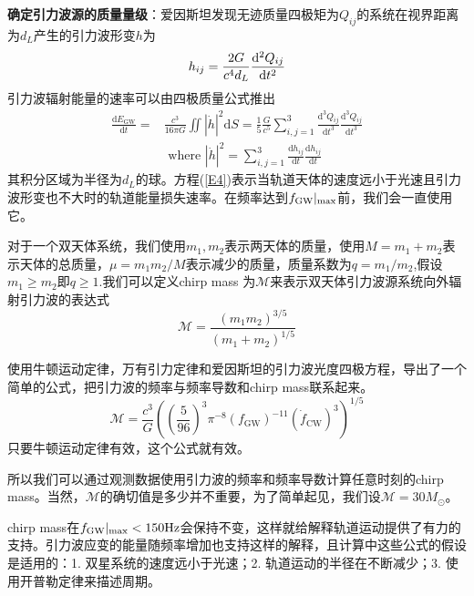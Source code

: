 \documentclass[UTF8]{ctexart}
\begin{document}
\textbf{确定引力波源的质量量级}：爱因斯坦发现无迹质量四极矩为$Q_{ij}$的系统在视界距离为$d_L$产生的引力波形变$h$为
\begin{equation}
h_{ij}=\frac{2G}{c^4d_L}\frac{{\rm d^2}Q_{ij}}{{\rm d}t^2}
\end{equation}
引力波辐射能量的速率可以由四极质量公式推出
\begin{equation}
\label{E4}
\begin{aligned} \frac{\mathrm{d} E_{\mathrm{GW}}}{\mathrm{d} t}=& \frac{c^{3}}{16 \pi G} \iint|\dot{h}|^{2} \mathrm{d} S=\frac{1}{5} \frac{G}{c^{5}} \sum_{i, j=1}^{3} \frac{\mathrm{d}^{3} Q_{i j}}{\mathrm{d} t^{3}} \frac{\mathrm{d}^{3} Q_{i j}}{\mathrm{d} t^{3}} \\ & \text { where }|\dot{h}|^{2}=\sum_{i, j=1}^{3} \frac{\mathrm{d} h_{i j}}{\mathrm{d} t} \frac{\mathrm{d} h_{i j}}{\mathrm{d} t} \end{aligned}
\end{equation}
其积分区域为半径为$d_L$的球。方程(\ref{E4})表示当轨道天体的速度远小于光速且引力波形变也不大时的轨道能量损失速率。在频率达到$f_{\rm GW}|_{\rm max}$前，我们会一直使用它。

对于一个双天体系统，我们使用$m_1, m_2$表示两天体的质量，使用$M=m_1+m_2$表示天体的总质量，$\mu = m_1m_2/M$表示减少的质量，质量系数为$q=m_1/m_2$,假设$m_1\geq m_2$即$q\geq 1$.我们可以定义chirp mass 为$\mathscr{M}$来表示双天体引力波源系统向外辐射引力波的表达式
\begin{equation}
\mathscr{M} = \frac{(m_1m_2)^{3/5}}{(m_1+m_2)^{1/5}}
\end{equation}

使用牛顿运动定律，万有引力定律和爱因斯坦的引力波光度四极方程，导出了一个简单的公式，把引力波的频率与频率导数和chirp mass联系起来。
\begin{equation}
\label{E6}
\mathscr{M}=\frac{c^{3}}{G}\left(\left(\frac{5}{96}\right)^{3} \pi^{-8}\left(f_{\mathrm{GW}}\right)^{-11}\left(\dot{f}_{\mathrm{CW}}\right)^{3}\right)^{1 / 5}
\end{equation}
只要牛顿运动定律有效，这个公式就有效。

所以我们可以通过观测数据使用引力波的频率和频率导数计算任意时刻的chirp mass。当然，$\mathscr{M}$的确切值是多少并不重要，为了简单起见，我们设$\mathscr{M}=30M_\odot$。

chirp mass在$f_{\rm GW}|_{\rm max}<150{\rm Hz}$会保持不变，这样就给解释轨道运动提供了有力的支持。引力波应变的能量随频率增加也支持这样的解释，且计算中这些公式的假设是适用的：1. 双星系统的速度远小于光速；2. 轨道运动的半径在不断减少；3. 使用开普勒定律来描述周期。
\end{document}
